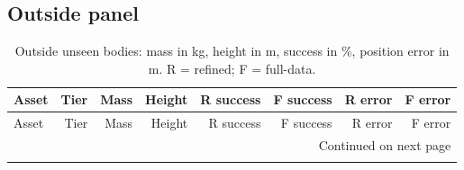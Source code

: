 \documentclass[11pt]{article}
\begin{document}
\subsection{Outside panel}
\begingroup\scriptsize
\setlength{\tabcolsep}{4pt}
\begin{longtable}{lrrrrrrr}
\caption{Outside unseen bodies: mass in kg, height in m, success in \%,
position error in m. R = refined; F = full-data.}\label{tab:all_outside}\\
\toprule
Asset & Tier & Mass & Height & R success & F success & R error & F error \\
\midrule\endfirsthead
\toprule
Asset & Tier & Mass & Height & R success & F success & R error & F error \\
\midrule\endhead
\midrule\multicolumn{8}{r}{Continued on next page}\\\endfoot
\bottomrule\endlastfoot


\end{longtable}
\end{document}
